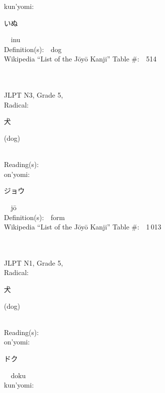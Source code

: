 \begin{multicols}{2}
{\hspace*{1em}}kun'yomi:\ \ \\
{\hspace*{2em}}{\begin{CJK}{UTF8}{min} いぬ \end{CJK}}\ \ inu\ \ \\
Definition(s):\ \ dog \\
Wikipedia ``List of the J\=oy\=o Kanji'' Table \#:\ \ 514 \\
\ \ \\
{\fontsize{34pt}{40pt}  }\ \ \\  %
{JLPT N3, Grade 5, \\Radical:\ \ {\begin{CJK}{UTF8}{min} 犬 \end{CJK}} (dog) } \\
Reading(s):\ \ \\
{\hspace*{1em}}on'yomi:\ \ \\
{\hspace*{2em}}{\begin{CJK}{UTF8}{min} ジョウ \end{CJK}}\ \ j\=o\ \ \\
Definition(s):\ \ form \\
Wikipedia ``List of the J\=oy\=o Kanji'' Table \#:\ \ 1\,013 \\
\ \ \\
{\fontsize{34pt}{40pt}  }\ \ \\  %
{JLPT N1, Grade 5, \\Radical:\ \ {\begin{CJK}{UTF8}{min} 犬 \end{CJK}} (dog) } \\
Reading(s):\ \ \\
{\hspace*{1em}}on'yomi:\ \ \\
{\hspace*{2em}}{\begin{CJK}{UTF8}{min} ドク \end{CJK}}\ \ doku\ \ \\
{\hspace*{1em}}kun'yomi:\ \ \\

\end{multicols}
